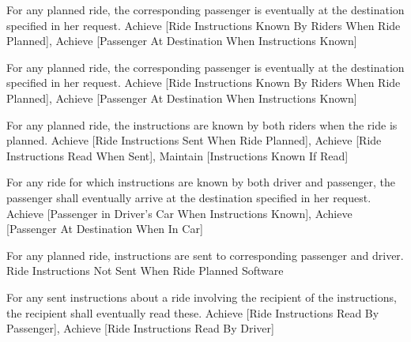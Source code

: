   \startkaosspec
  	 {For any planned ride, the corresponding passenger is eventually at the destination specified in her request.}
  	 {Achieve [Ride Instructions Known By Riders When Ride Planned], Achieve [Passenger At Destination When Instructions Known]}
  \stopkaosspec
  

    {}

  \startkaosspec
  	 {For any planned ride, the corresponding passenger is eventually at the destination specified in her request.}
  	 {Achieve [Ride Instructions Known By Riders When Ride Planned], Achieve [Passenger At Destination When Instructions Known]}
  \stopkaosspec
  
  \startkaosspec
  	 {For any planned ride, the instructions are known by both riders when the ride is planned.}
  	 {Achieve [Ride Instructions Sent When Ride Planned], Achieve [Ride Instructions Read When Sent], Maintain [Instructions Known If Read]}
  \stopkaosspec

  \startkaosspec
  	 {For any ride for which instructions are known by both driver and passenger, the passenger shall eventually arrive at the destination specified in her request.}
  	 {Achieve [Passenger in Driver's Car When Instructions Known], Achieve [Passenger At Destination When In Car]}
  \stopkaosspec

  \startkaosspec
  	 {For any planned ride, instructions are sent to corresponding passenger and driver.}
  	 {Ride Instructions Not Sent When Ride Planned}
  	 {Software}
  \stopkaosspec

  \startkaosspec
  	 {For any sent instructions about a ride involving the recipient of the instructions, the recipient shall eventually read these.}
  	 {Achieve [Ride Instructions Read By Passenger], Achieve [Ride Instructions Read By Driver]}
  \stopkaosspec

